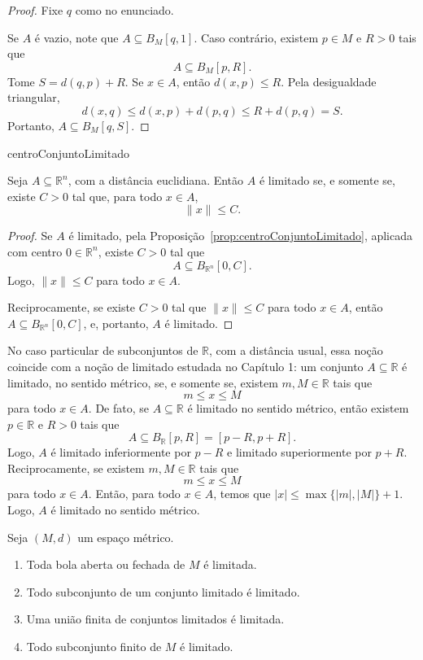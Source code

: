 \begin{proof}
    Fixe $q$ como no enunciado.
    
    Se $A$ é vazio, note que $A\subseteq B_M[q,1]$.
    Caso contrário, existem $p\in M$ e $R>0$ tais que
    \[
        A\subseteq B_M[p,R].
    \]
    Tome $S=d(q,p)+R$.
    Se $x\in A$, então $d(x,p)\leq R$.
    Pela desigualdade triangular,
    \[
        d(x,q)\leq d(x,p)+d(p,q)\leq R+d(p,q)=S.
    \]
    Portanto, $A\subseteq B_M[q,S]$.
\end{proof}

{centroConjuntoLimitado}

\begin{corollary}\label{cor:limitadoRnNorma}
    Seja $A\subseteq\mathbb R^n$, com a distância euclidiana.
    Então $A$ é limitado se, e somente se, existe $C>0$ tal que, para todo $x\in A$,
    \[
        \|x\|\leq C.
    \]
\end{corollary}

\begin{proof}
    Se $A$ é limitado, pela Proposição~\ref{prop:centroConjuntoLimitado}, aplicada com centro $0\in\mathbb R^n$, existe $C>0$ tal que
    \[
        A\subseteq B_{\mathbb R^n}[0,C].
    \]
    Logo, $\|x\|\leq C$ para todo $x\in A$.

    Reciprocamente, se existe $C>0$ tal que $\|x\|\leq C$ para todo $x\in A$, então $A\subseteq B_{\mathbb R^n}[0,C]$, e, portanto, $A$ é limitado.
\end{proof}

No caso particular de subconjuntos de $\mathbb R$, com a distância usual, essa noção coincide com a noção de limitado estudada no Capítulo 1: um conjunto $A\subseteq\mathbb R$ é limitado, no sentido métrico, se, e somente se, existem $m,M\in\mathbb R$ tais que
\[
    m\leq x\leq M
\]
para todo $x\in A$.
De fato, se $A\subseteq\mathbb R$ é limitado no sentido métrico, então existem $p\in\mathbb R$ e $R>0$ tais que
\[
    A\subseteq B_{\mathbb R}[p,R]=[p-R,p+R].
\]
Logo, $A$ é limitado inferiormente por $p-R$ e limitado superiormente por $p+R$.
Reciprocamente, se existem $m,M\in\mathbb R$ tais que
\[
    m\leq x\leq M
\]
para todo $x\in A$.
Então, para todo $x\in A$, temos que $|x|\leq \max\{|m|,|M|\}+1$.
Logo, $A$ é limitado no sentido métrico.

\begin{proposition}
    Seja $(M,d)$ um espaço métrico.
    \begin{enumerate}[label=(\roman*)]
        \item Toda bola aberta ou fechada de $M$ é limitada.
        \item Todo subconjunto de um conjunto limitado é limitado.
        \item Uma união finita de conjuntos limitados é limitada.
        \item Todo subconjunto finito de $M$ é limitado.
    \end{enumerate}
\end{proposition}

